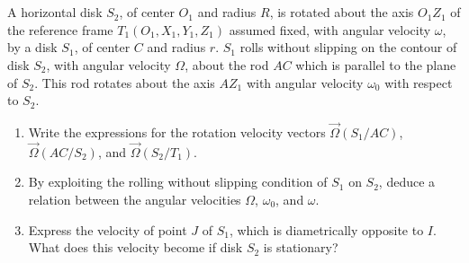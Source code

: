\documentclass[12pt]{article}
\begin{document}
\newpage
\section{}

A horizontal disk $S_2$, of center $O_1$ and radius $R$, is rotated about the axis $O_1Z_1$ of the reference frame $T_1(O_1, X_1, Y_1, Z_1)$ assumed fixed, with angular velocity $\omega$, by a disk $S_1$, of center $C$ and radius $r$. $S_1$ rolls without slipping on the contour of disk $S_2$, with angular velocity $\Omega$, about the rod $AC$ which is parallel to the plane of $S_2$. This rod rotates about the axis $AZ_1$ with angular velocity $\omega_0$ with respect to $S_2$.

\begin{enumerate}
    \item Write the expressions for the rotation velocity vectors $\vec{\Omega}(S_1/AC)$, $\vec{\Omega}(AC/S_2)$, and $\vec{\Omega}(S_2/T_1)$.
    \item By exploiting the rolling without slipping condition of $S_1$ on $S_2$, deduce a relation between the angular velocities $\Omega$, $\omega_0$, and $\omega$.
    \item Express the velocity of point $J$ of $S_1$, which is diametrically opposite to $I$. What does this velocity become if disk $S_2$ is stationary?
\end{enumerate}
\end{document}
